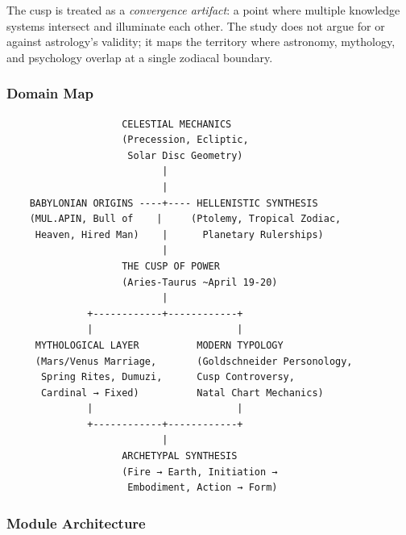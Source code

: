 \documentclass[11pt,letterpaper]{article}
\begin{document}
The cusp is treated as a \textit{convergence artifact}: a point where multiple knowledge systems intersect and illuminate each other. The study does not argue for or against astrology's validity; it maps the territory where astronomy, mythology, and psychology overlap at a single zodiacal boundary.

\subsubsection{Domain Map}

\begin{asciibox}
\begin{verbatim}
                    CELESTIAL MECHANICS
                    (Precession, Ecliptic,
                     Solar Disc Geometry)
                           |
                           |
    BABYLONIAN ORIGINS ----+---- HELLENISTIC SYNTHESIS
    (MUL.APIN, Bull of    |     (Ptolemy, Tropical Zodiac,
     Heaven, Hired Man)    |      Planetary Rulerships)
                           |
                    THE CUSP OF POWER
                    (Aries-Taurus ~April 19-20)
                           |
              +------------+------------+
              |                         |
     MYTHOLOGICAL LAYER          MODERN TYPOLOGY
     (Mars/Venus Marriage,       (Goldschneider Personology,
      Spring Rites, Dumuzi,      Cusp Controversy,
      Cardinal → Fixed)          Natal Chart Mechanics)
              |                         |
              +------------+------------+
                           |
                    ARCHETYPAL SYNTHESIS
                    (Fire → Earth, Initiation →
                     Embodiment, Action → Form)
\end{verbatim}
\end{asciibox}

\subsubsection{Module Architecture}
\end{document}
